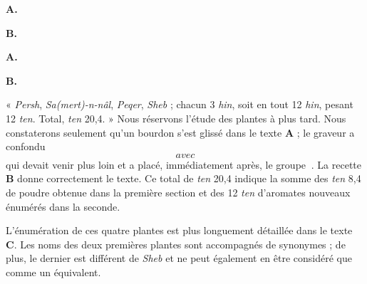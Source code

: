 \documentclass[a4paper, 11pt, oneside, landscape]{article}
\newcommand*\hieroAAAR{}
\newcommand*\hieroAABT{}
\newcommand*\hieroAAEH{\raisebox{0.5ex}{}}
\newcommand*\hieroAAFO{\raisebox{0.5ex}{}}
\newcommand*\hieroAAFT{}
\newcommand*\hieroAAGA{}
\newcommand*\hieroAAGD{}
\newcommand*\hieroAAGN{}
\newcommand*\hieroAAHX{}
\newcommand*\hieroAAIT{}
\newcommand*\hieroAAIU{}
\newcommand*\hieroAAJH{}
\newcommand*\hieroAAKW{}
\newcommand*\hieroAAKX{}
\newcommand*\hieroAAKY{}
\newcommand*\hieroAAKZ{}
\newcommand*\hieroAALA{}
\newcommand*\hieroAALB{}
\newcommand*\hieroAALC{}
\newcommand*\hieroAALD{}
\newcommand*\hieroAALE{}
\newcommand*\hieroAALF{}
\newcommand*\hieroAALG{}
\newcommand*\hieroAALH{}
\newcommand*\hieroAALI{}
\newcommand*\hieroAALJ{}
\newcommand*\hieroAAMQ{}
\begin{document}
\hspace*{10mm}\textbf{A.}\hspace*{5mm} $\hieroAAKW\:\hieroAAAR\:\hieroAAKX$ \hspace*{5mm} $\hieroAAKY\:\hieroAAKZ\:\hieroAAKX$ \hspace*{7.2mm} $\hieroAALA\:\hieroAAAR\:\hieroAAKX$ \hspace*{5mm} $\hieroAALB\:\hieroAAAR\:\hieroAAKX$

\hspace*{10mm}\textbf{B.}\hspace*{5mm} $\hieroAALC\:\hieroAAFO\:\hieroAALD$ \hspace*{6mm} $\hieroAALE\:\hieroAAEH\:\hieroAALF\:\hieroAAGD\:\hieroAABT\:\hieroAAKX$ \hspace*{1mm} $\hieroAALA\:\hieroAAGD\:\hieroAAKX$ \hspace*{5mm} $\hieroAAHX\:\hieroAAFO\:\hieroAAKX$

\hspace*{10mm}\textbf{A.}\hspace*{5mm} $\hieroAALG\:\hieroAAIU$ \hspace*{15mm} $\hieroAAIT\:\hieroAAIU\:\hieroAAGA\:\hieroAAJH$

\hspace*{10mm}\textbf{B.}\hspace*{5mm} $\hieroAALG\:\hieroAAIU\:\hieroAAGN\:\hieroAAFT\:\hieroAAIU\:\hieroAAGN\:\hieroAAFT\:\hieroAAMQ\:\hieroAAGA\:\hieroAALH$

« \emph{Persh}, \emph{Sa(mert)-n-nâl}, \emph{Peqer}, \emph{Sheb} ; chacun 3 \emph{hin}, soit en tout 12 \emph{hin}, pesant 12 \emph{ten}. Total, \emph{ten} 20,4. » Nous réservons l'étude des plantes à plus tard. Nous constaterons seulement qu'un bourdon s'est glissé dans le texte \textbf{A} ; le graveur a confondu $\hieroAALI$ avec $\hieroAALJ$ qui devait venir plus loin et a placé, immédiatement après, le groupe $\hieroAAGA\:\hieroAAJH$. La recette \textbf{B} donne correctement le texte. Ce total de \emph{ten} 20,4 indique la somme des \emph{ten} 8,4 de poudre obtenue dans la première section et des 12 \emph{ten} d'aromates nouveaux énumérés dans la seconde.

L'énumération de ces quatre plantes est plus longuement détaillée dans le texte \textbf{C}. Les noms des deux premières plantes sont accompagnés de synonymes ; de plus, le dernier est différent de \emph{Sheb} et ne peut également en être considéré que comme un équivalent.
\end{document}
